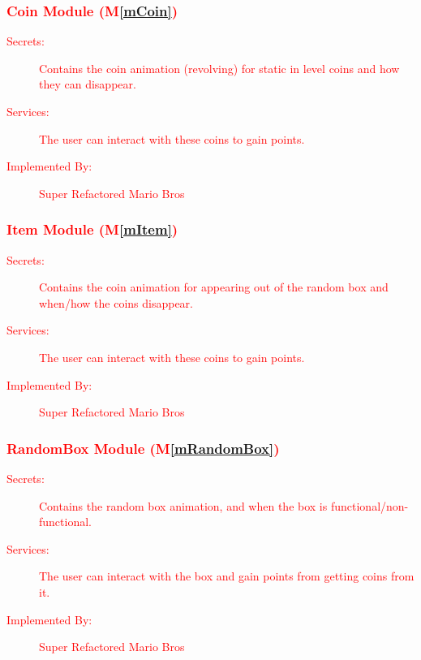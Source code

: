 \documentclass[12pt, titlepage]{article}
\newcommand{\mref}[1]{M\ref{#1}}
\begin{document}
\subsubsection{\textcolor{red}{Coin Module (\mref{mCoin})}}

\begin{description}
\item[\textcolor{red}{Secrets:}] \textcolor{red}{Contains the coin animation (revolving) for static in level coins and how they can disappear.}
\item[\textcolor{red}{Services:}] \textcolor{red}{The user can interact with these coins to gain points.}
\item[\textcolor{red}{Implemented By:}] \textcolor{red}{Super Refactored Mario Bros}
\end{description}

\subsubsection{\textcolor{red}{Item Module (\mref{mItem})}}

\begin{description}
\item[\textcolor{red}{Secrets:}] \textcolor{red}{Contains the coin animation for appearing out of the random box and when/how the coins disappear.}
\item[\textcolor{red}{Services:}] \textcolor{red}{The user can interact with these coins to gain points.}
\item[\textcolor{red}{Implemented By:}] \textcolor{red}{Super Refactored Mario Bros}
\end{description}

\subsubsection{\textcolor{red}{RandomBox Module (\mref{mRandomBox})}}

\begin{description}
\item[\textcolor{red}{Secrets:}] \textcolor{red}{Contains the random box animation, and when the box is functional/non-functional.}
\item[\textcolor{red}{Services:}] \textcolor{red}{The user can interact with the box and gain points from getting coins from it.}
\item[\textcolor{red}{Implemented By:}] \textcolor{red}{Super Refactored Mario Bros}
\end{description}
\end{document}
